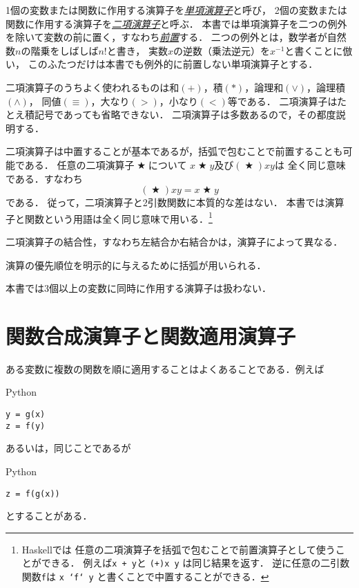 \documentclass[a5paper,draft]{jsbook}
\newcommand{\programminglanguage}[1]{\textsf{#1}}
\newcommand{\haskell}{\programminglanguage{Haskell}}
\newcommand{\python}{\programminglanguage{Python}}
\newcommand{\keyword}[1]{{\underline{\emph{#1}}}}
\newcommand{\code}[1]{\texttt{#1}}
\newenvironment{pythoncode}{\begin{itembox}[r]{\python}}{\end{itembox}}
\newcommand{\mathBinaryOperator}[1]{\operatorname{#1}}
\newcommand{\mathAnyBinaryOperator}{\mathBinaryOperator{\bigstar}}
\begin{document}
1個の変数または関数に作用する演算子を\keyword{単項演算子}と呼び，
2個の変数または関数に作用する演算子を\keyword{二項演算子}と呼ぶ．
本書では単項演算子を二つの例外を除いて変数の前に置く，すなわち\keyword{前置}する．
二つの例外とは，数学者が自然数$n$の階乗をしばしば$n!$と書き，
実数$x$の逆数（乗法逆元）を$x^{-1}$と書くことに倣い，
このふたつだけは本書でも例外的に前置しない単項演算子とする．

二項演算子のうちよく使われるものは和$(+)$，積$(*)$，論理和$(\vee)$，論理積$(\wedge)$，
同値$(\equiv)$，大なり$(>)$，小なり$(<)$等である．
二項演算子はたとえ積記号であっても省略できない．
二項演算子は多数あるので，その都度説明する．

二項演算子は中置することが基本であるが，括弧で包むことで前置することも可能である．
任意の二項演算子$\mathAnyBinaryOperator$について
$x\mathAnyBinaryOperator y$及び$\left(\mathAnyBinaryOperator\right)xy$は
全く同じ意味である．すなわち
\begin{equation}
\left(\mathAnyBinaryOperator\right)xy=x\mathAnyBinaryOperator y
\end{equation}
である．
従って，二項演算子と2引数関数に本質的な差はない．
本書では演算子と関数という用語は全く同じ意味で用いる．\footnote{\haskell では
任意の二項演算子を括弧で包むことで前置演算子として使うことができる．
例えば\code{x + y}と \code{(+)x y} は同じ結果を返す．
逆に任意の二引数関数\code{f}は \code{x `f` y} と書くことで中置することができる．}

二項演算子の結合性，すなわち左結合か右結合かは，演算子によって異なる．

演算の優先順位を明示的に与えるために括弧が用いられる．

本書では3個以上の変数に同時に作用する演算子は扱わない．

\section{関数合成演算子と関数適用演算子}

ある変数に複数の関数を順に適用することはよくあることである．例えば
\begin{pythoncode}
\begin{verbatim}
y = g(x)
z = f(y)
\end{verbatim}
\end{pythoncode}
あるいは，同じことであるが
\begin{pythoncode}
\begin{verbatim}
z = f(g(x))
\end{verbatim}
\end{pythoncode}
とすることがある．
\end{document}
